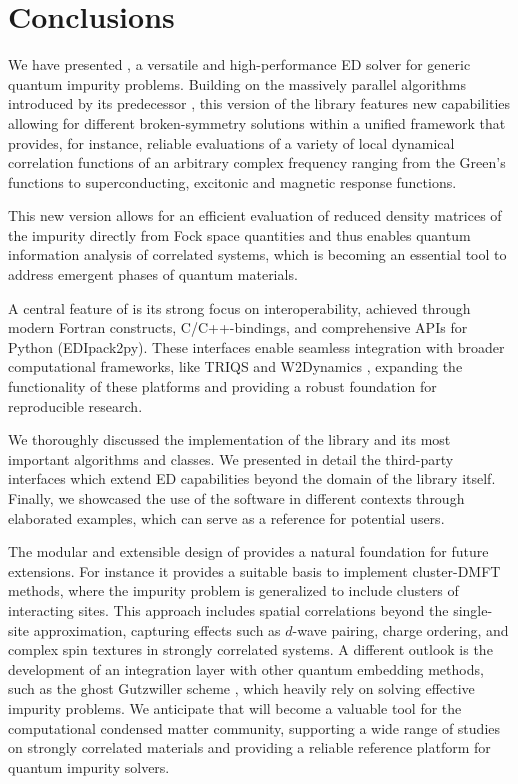 \documentclass[edipack_sp.tex]{subfiles}
\begin{document}
\section{Conclusions}
We have presented \NAME{}, a versatile and high-performance ED solver for generic quantum impurity problems. Building on the massively
parallel algorithms introduced by its predecessor \cite{Amaricci2022CPC}, this version of
the library features new capabilities allowing for different broken-symmetry solutions within a unified
framework that provides, for instance, reliable evaluations of a variety of local dynamical correlation
functions of an arbitrary complex frequency ranging from the Green's functions to superconducting, excitonic and magnetic response functions.

This new version allows for an efficient evaluation of 
reduced density matrices of the impurity directly from Fock space quantities and thus enables  
quantum information analysis of correlated systems, which is becoming an essential tool to address emergent phases of quantum materials.

A central feature of \NAME is its strong focus on interoperability,
achieved through modern Fortran constructs, C/C++-bindings, and
comprehensive APIs for Python (EDIpack2py). 
These interfaces enable seamless integration with broader
computational frameworks, like TRIQS \cite{Parcollet2015CPC} and
W2Dynamics \cite{Wallerberger2019CPC}, expanding the
functionality of these platforms and providing a robust foundation for
reproducible research.

We thoroughly discussed the implementation of the \NAME library and its
most important algorithms and classes. We presented in
detail the third-party interfaces which extend ED
capabilities beyond the domain of the library itself. 
Finally, we showcased the use of the \NAME software in different
contexts through elaborated examples, which can serve as a reference for potential users. 

The modular and extensible design of \NAME provides a
natural foundation for future extensions.
For instance it provides a suitable basis to implement cluster-DMFT \cite{Capone2004PRB,Kotliar2006RMP,Park2008PRL} methods, where the
impurity problem is generalized to include clusters of interacting
sites. This approach includes spatial correlations beyond the single-site approximation, capturing effects
such as $d$-wave pairing, charge ordering, and complex spin textures in strongly correlated systems.
A different outlook is the development of an integration layer with other quantum embedding methods, such as the ghost Gutzwiller scheme \cite{Lanata2015PRX},
which heavily rely on solving effective impurity problems.    
We anticipate that \NAME will become a valuable tool for the computational condensed matter community, supporting a wide range of
studies on strongly correlated materials and providing a reliable
reference platform for quantum impurity solvers.
\end{document}
